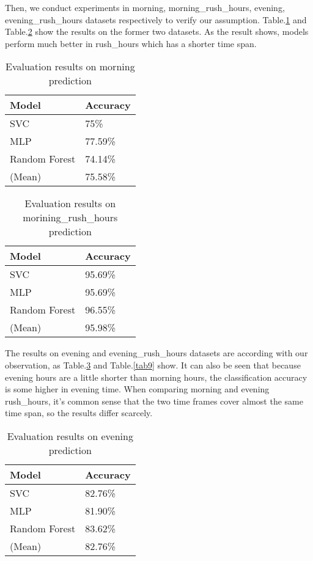 Then, we conduct experiments in morning, morning\_rush\_hours, evening, evening\_rush\_hours datasets respectively to verify our assumption. Table.\ref{tab6} and Table.\ref{tab7} show the results on the former two datasets. As the result shows, models perform much better in rush\_hours which has a shorter time span.
\begin{table}[htbp]
	\caption{Evaluation results on morning prediction}
	\begin{center}
		\begin{tabular}{|l|l|}
			\hline
			Model & Accuracy\\
			\hline
			SVC & 75\%\\
			\hline
			MLP & 77.59\%\\
			\hline
			Random Forest & 74.14\%\\
			\hline
			(Mean) & 75.58\%\\
			\hline
		\end{tabular}
		\label{tab6}
	\end{center}
\end{table}

\begin{table}[htbp]
	\caption{Evaluation results on morining\_rush\_hours prediction}
	\begin{center}
		\begin{tabular}{|l|l|}
			\hline
			Model & Accuracy\\
			\hline
			SVC & 95.69\%\\
			\hline
			MLP & 95.69\%\\
			\hline
			Random Forest & 96.55\%\\
			\hline
			(Mean) & 95.98\%\\
			\hline
		\end{tabular}
		\label{tab7}
	\end{center}
\end{table}
The results on evening and evening\_rush\_hours datasets are according with our observation, as Table.\ref{tab8} and Table.\ref{tab9} show. It can also be seen that because evening hours are a little shorter than morning hours, the classification accuracy is some higher in evening time. When comparing morning and evening rush\_hours, it's common sense that the two time frames cover almost the same time span, so the results differ scarcely.
\begin{table}[!htbp]
	\caption{Evaluation results on evening prediction}
	\begin{center}
		\begin{tabular}{|l|l|}
			\hline
			Model & Accuracy\\
			\hline
			SVC & 82.76\%\\
			\hline
			MLP & 81.90\%\\
			\hline
			Random Forest & 83.62\%\\
			\hline
			(Mean) & 82.76\%\\
			\hline
		\end{tabular}
		\label{tab8}
	\end{center}
\end{table}

